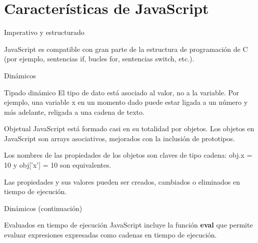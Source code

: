 \section{Características de JavaScript}

\begin{frame}[c]{Imperativo y estructurado}

  \begin{exampleblock}{}
    JavaScript es compatible con gran parte de la estructura de programación
    de C (por ejemplo, sentencias if, bucles for, sentencias switch, etc.).
  \end{exampleblock}

\end{frame}

\begin{frame}[c]{Dinámicos}

  \begin{block}{Tipado dinámico}
    El tipo de dato está asociado al valor, no a la variable. Por ejemplo,
    una variable x en un momento dado puede estar ligada a un número y más
    adelante, religada a una cadena de texto.
  \end{block}

  \begin{block}{Objetual}
    JavaScript está formado casi en su totalidad por objetos. Los objetos
    en JavaScript son arrays asociativos, mejorados con la inclusión de
    prototipos.

    \vspace{\baselineskip}
    Los nombres de las propiedades de los objetos son claves de tipo
    cadena: obj.x = 10 y obj['x'] = 10 son equivalentes.

    \vspace{\baselineskip}
    Las propiedades y sus valores pueden ser creados, cambiados o
    eliminados en tiempo de ejecución.
  \end{block}

\end{frame}

\begin{frame}[c]{Dinámicos (continuación)}

  \begin{block}{Evaluados en tiempo de ejecución}
    JavaScript incluye la función \textbf{eval} que permite evaluar
    expresiones expresadas como cadenas en tiempo de ejecución.
  \end{block}

\end{frame}


